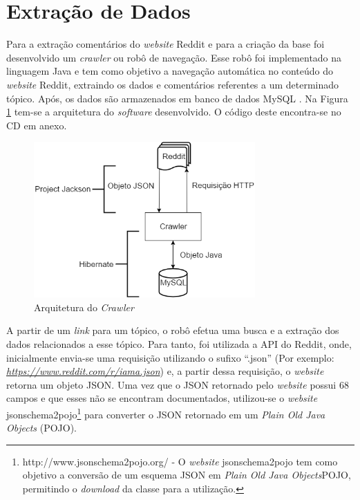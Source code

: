 \section{Extração de Dados}
\label{cap:Extracao}

Para a extração comentários do \textit{website} Reddit e para a criação da base
foi desenvolvido um \textit{crawler} ou robô de navegação. Esse robô foi
implementado na linguagem Java e tem como objetivo a navegação automática no
conteúdo do \textit{website} Reddit, extraindo os dados e comentários referentes a um
determinado tópico. Após, os dados são armazenados em banco de dados MySQL
\cite{Widenius:2002:MRM:560480}.
Na Figura \ref{fig:crawler} tem-se a arquitetura do \textit{software}
desenvolvido. O código deste encontra-se no CD em anexo.

\begin{figure}[htbp]
\centering
\includegraphics[height=225px]{imagens/arquitetura.png}
\caption{Arquitetura do \textit{Crawler}}
\label{fig:crawler}
\end{figure}

A partir de um \textit{link} para um tópico, o robô efetua uma busca e a
extração dos dados relacionados a esse tópico. Para tanto, foi utilizada a
\ac{API} do Reddit, onde, inicialmente envia-se uma requisição utilizando o
sufixo ``.json'' (Por exemplo:
\textit{\url{https://www.reddit.com/r/iama.json}}) e, a partir dessa requisição,
o \textit{website} retorna um objeto \ac{JSON}. Uma vez que o \ac{JSON}
retornado pelo \textit{website} possui 68 campos e que esses não se encontram
documentados, utilizou-se o \textit{website}
jsonschema2pojo\footnote{http://www.jsonschema2pojo.org/ - O \textit{website}
jsonschema2pojo tem como objetivo a conversão de um esquema \ac{JSON} em
\textit{Plain Old Java Objects}\ac{POJO}, permitindo o \textit{download} da classe para a utilização.} para converter o
JSON retornado em um \textit{Plain Old Java Objects} (\ac{POJO}).

